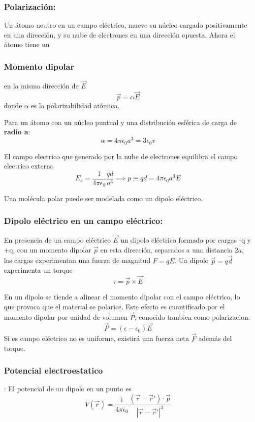 \documentclass[a4paper, 10pt]{article}
\begin{document}
\begin{multicols*}{2}
	\subsubsection{Polarización:} Un átomo neutro en un campo eléctrico, mueve su núcleo cargado positivamente en una dirección, y su nube de electrones en una dirección opuesta. Ahora el átomo tiene un \subsubsection{Momento dipolar} en la misma dirección de $\vec{E}$ $$\vec{p}= \alpha \vec{E}$$
	donde $\alpha$ es la polarizabilidad atómica.
	    
	Para un átomo con un núcleo puntual y
  una distribución esférica de carga de \textbf{radio a}:
	$$\alpha = 4 \pi \epsilon_0 a^3 = 3 \epsilon_0 v$$
	     
	El campo electrico que generado por la nube de electrones equilibra el campo electrico externo $$E_e = \frac{1}{4 \pi \epsilon _0} \frac{qd}{a^3} \implies p \equiv qd = 4 \pi \epsilon_0a^3E$$
	    
	Una molécula polar puede ser modelada como un dipolo eléctrico.
	    
	\subsubsection{Dipolo eléctrico en un campo eléctrico:} En presencia de un campo eléctrico $\vec{E}$ un dipolo eléctrico formado por cargas -q y +q, con un momento dipolar $\vec{p}$ en esta dirección, separados a una distancia $2a$, las cargas experimentan una fuerza de magnitud $F=qE$. Un dipolo $\vec{p} =q \vec{d}$ experimenta un torque 
	$$\tau = \vec{p} \times \vec{E}$$
	    
	En un dipolo se tiende a alinear el momento dipolar con el campo eléctrico, lo que provoca que el material se polarice. Este efecto es cuantificado por el momento dipolar por unidad de volumen $\vec{P}$, conocido tambien como polarizacion.
	$$\vec{P} = (\epsilon - \epsilon_0) \vec{E}$$
	Si es campo eléctrico no es uniforme, existirá una fuerza neta $\vec{F}$ además del torque.
	    
	\subsubsection{Potencial electroestatico}: El potencial de un dipolo en un punto es 
	$$V(\vec{r})=\frac{1}{4 \pi \epsilon_0} \frac{(\vec{r}- \vec{r}') \cdot \vec{p}}{|\vec{r}- \vec{r}'|^3}$$
	    

\end{multicols*}
\end{document}
